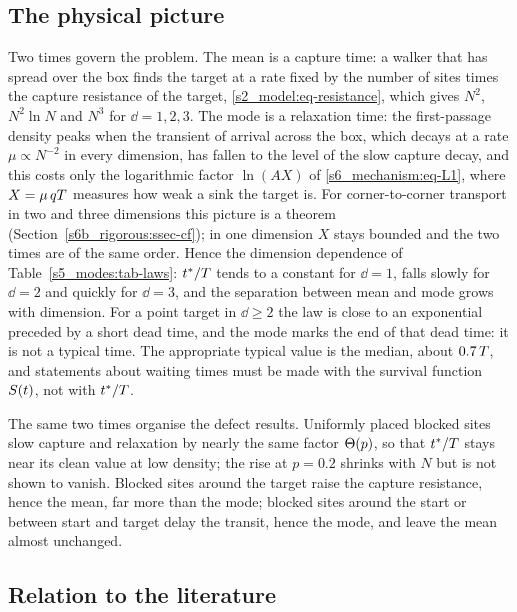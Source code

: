 \subsection{The physical picture}\label{s9_discussion:ssec-picture}

Two times govern the problem. The mean is a capture time: a walker that has spread over the box finds the target at a
rate fixed by the number of sites times the capture resistance of the target, \eqref{s2_model:eq-resistance}, which gives
$N^{2}$, $N^{2}\ln N$ and $N^{3}$ for $\dd=1,2,3$. The mode is a relaxation time: the first-passage density peaks when the
transient of arrival across the box, which decays at a rate $\mu\propto N^{-2}$ in every dimension, has fallen to the level
of the slow capture decay, and this costs only the logarithmic factor $\ln(AX)$ of \eqref{s6_mechanism:eq-L1}, where
$X=\mu\,qT$ measures how weak a sink the target is. For corner-to-corner transport in two and three dimensions this
picture is a theorem (Section~\ref{s6b_rigorous:ssec-cf}); in one dimension $X$ stays bounded and the two times are of the
same order. Hence the dimension dependence of Table~\ref{s5_modes:tab-laws}: $t^{*}/T$ tends to a constant for $\dd=1$,
falls slowly for $\dd=2$ and quickly for $\dd=3$, and the separation between mean and mode grows with dimension. For a
point target in $\dd\ge2$ the law is close to an exponential preceded by a short dead time, and the mode marks the end of
that dead time: it is not a typical time. The appropriate typical value is the median, about $0.7\,T$, and statements
about waiting times must be made with the survival function $S(t)$, not with $t^{*}/T$.

The same two times organise the defect results. Uniformly placed blocked sites slow capture and relaxation by nearly the
same factor $\Theta(p)$, so that $t^{*}/T$ stays near its clean value at low density; the rise at $p=0.2$ shrinks with $N$
but is not shown to vanish. Blocked sites around the target raise the capture resistance, hence the mean, far more than
the mode; blocked sites around the start or between start and target delay the transit, hence the mode, and leave the
mean almost unchanged.

\subsection{Relation to the literature}\label{s9_discussion:ssec-literature}

